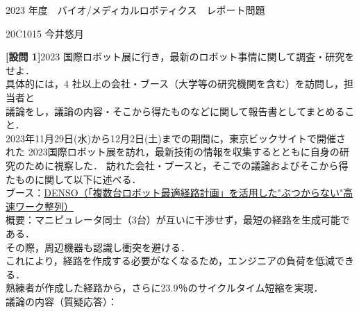 \documentclass{jsarticle}
\begin{document}
\vspace*{-20mm}
{\LARGE 2023 年度　バイオ/メディカルロボティクス　レポート問題}
\begin{flushright}
\large 20C1015 今井悠月
\end{flushright}
\vspace*{10mm}

\textbf{{[設問 1]}}\hspace*{1zw}2023 国際ロボット展に行き，最新のロボット事情に関して調査・研究をせよ．\\
\hspace*{5.7zw}具体的には，4 社以上の会社・ブース（大学等の研究機関を含む）を訪問し，担当者と\\
\hspace*{5.7zw}議論をし，議論の内容・そこから得たものなどに関して報告書としてまとめること．\\

\hspace*{5.7zw}2023年11月29日(水)から12月2日(土)までの期間に，東京ビックサイトで開催された
\hspace*{5.7zw}2023国際ロボット展を訪れ，最新技術の情報を収集するとともに自身の研究のために視察した．
\hspace*{5.7zw}訪れた会社・ブースと，そこでの議論およびそこから得たものに関して以下に述べる．\\

\vspace*{4mm}
\hspace*{4.7zw}ブース：\underline{DENSO（「複数台ロボット最適経路計画」を活用した"ぶつからない"高速ワーク整列）}\\

\hspace*{4.7zw}概要：マニピュレータ同士（3台）が互いに干渉せず，最短の経路を生成可能である．\\
\hspace*{8.7zw}その際，周辺機器も認識し衝突を避ける．\\
\hspace*{8.7zw}これにより，経路を作成する必要がなくなるため，エンジニアの負荷を低減できる．\\
\hspace*{8.7zw}熟練者が作成した経路から，さらに23.9％のサイクルタイム短縮を実現．\\


\hspace*{4.7zw}議論の内容（質疑応答）：
\end{document}

